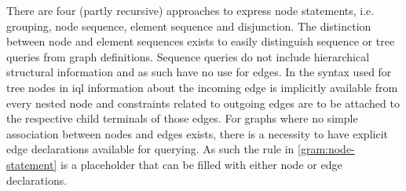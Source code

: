 \documentclass[11pt,a4paper]{article}
\begin{document}
\noindent There are four (partly recursive) approaches to express node statements, i.e. grouping, node sequence, element sequence and disjunction. 
The distinction between node and element sequences exists to easily distinguish sequence or tree queries from graph definitions.
Sequence queries do not include hierarchical structural information and as such have no use for edges.
In the syntax used for tree nodes in \ac{iql} information about the incoming edge is implicitly available from every nested node and constraints related to outgoing edges are to be attached to the respective child terminals of those edges.
For graphs where no simple association between nodes and edges exists, there is a necessity to have explicit edge declarations available for querying.
As such the  rule in \cref{gram:node-statement} is a placeholder that can be filled with either node or edge declarations.
\end{document}
